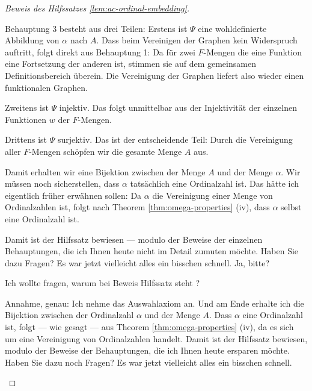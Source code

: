 \begin{proof}[Beweis des Hilfssatzes \ref{lem:ac-ordinal-embedding}]
\begin{spoken-clean}[01:10:21 - 01:12:15]
Behauptung 3 besteht aus drei Teilen: Erstens ist $\Psi$ eine wohldefinierte Abbildung von $\alpha$ nach $A$. Dass beim Vereinigen der Graphen kein Widerspruch auftritt, folgt direkt aus Behauptung 1: Da für zwei $F$-Mengen die eine Funktion eine Fortsetzung der anderen ist, stimmen sie auf dem gemeinsamen Definitionsbereich überein. Die Vereinigung der Graphen liefert also wieder einen funktionalen Graphen.

Zweitens ist $\Psi$ injektiv. Das folgt unmittelbar aus der Injektivität der einzelnen Funktionen $w$ der $F$-Mengen.

Drittens ist $\Psi$ surjektiv. Das ist der entscheidende Teil: Durch die Vereinigung aller $F$-Mengen schöpfen wir die gesamte Menge $A$ aus.

Damit erhalten wir eine Bijektion zwischen der Menge $A$ und der Menge $\alpha$. Wir müssen noch sicherstellen, dass $\alpha$ tatsächlich eine Ordinalzahl ist. Das hätte ich eigentlich früher erwähnen sollen: Da $\alpha$ die Vereinigung einer Menge von Ordinalzahlen ist, folgt nach Theorem \ref{thm:omega-properties} (iv), dass $\alpha$ selbst eine Ordinalzahl ist.

Damit ist der Hilfssatz bewiesen --- modulo der Beweise der einzelnen Behauptungen, die ich Ihnen heute nicht im Detail zumuten möchte. Haben Sie dazu Fragen? Es war jetzt vielleicht alles ein bisschen schnell. Ja, bitte?
\end{spoken-clean}

\begin{student-interaction}[Studentenfrage]
Ich wollte fragen, warum bei Beweis Hilfssatz steht ?
\end{student-interaction}

\begin{spoken-clean}[01:12:15 - 01:12:36]
Annahme, genau: Ich nehme das Auswahlaxiom an. Und am Ende erhalte ich die Bijektion zwischen der Ordinalzahl $\alpha$ und der Menge $A$. Dass $\alpha$ eine Ordinalzahl ist, folgt --- wie gesagt --- aus Theorem \ref{thm:omega-properties} (iv), da es sich um eine Vereinigung von Ordinalzahlen handelt. Damit ist der Hilfssatz bewiesen, modulo der Beweise der Behauptungen, die ich Ihnen heute ersparen möchte. Haben Sie dazu noch Fragen? Es war jetzt vielleicht alles ein bisschen schnell.
\end{spoken-clean}


\end{proof}

